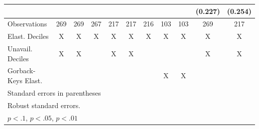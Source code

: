 {\begin{tabular}{l*{10}{c}}
                    &                     &                     &                     &                     &                     &                     &                     &                     &     (0.227)         &     (0.254)         \\
\hline
Observations        &         269         &         269         &         267         &         217         &         217         &         216         &         103         &         103         &         269         &         217         \\
Elast. Deciles      &           X         &           X         &           X         &           X         &           X         &           X         &           X         &           X         &           X         &           X         \\
Unavail. Deciles    &           X         &           X         &                     &           X         &           X         &                     &                     &                     &           X         &           X         \\
Gorback-Keys Elast. &                     &                     &                     &                     &                     &                     &           X         &           X         &                     &                     \\
\hline\hline
\multicolumn{11}{l}{\footnotesize Standard errors in parentheses}\\
\multicolumn{11}{l}{\footnotesize Robust standard errors.}\\
\multicolumn{11}{l}{\footnotesize \sym{*} \(p<.1\), \sym{**} \(p<.05\), \sym{***} \(p<.01\)}\\
\end{tabular}
}
